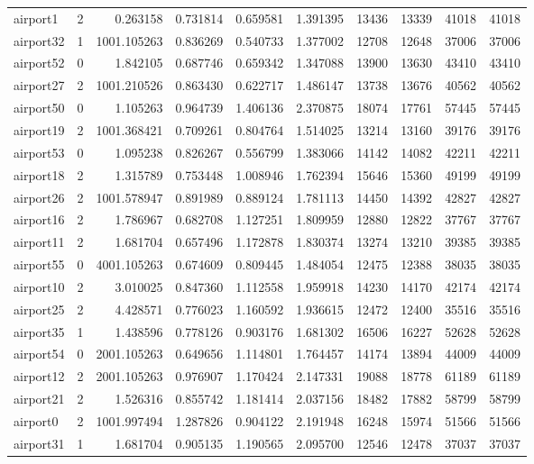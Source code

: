 \begin{longtable}{|l|r|r|r|r|r|r|r|r|r|}
airport1 & 2 & 0.263158 & 0.731814 & 0.659581 & 1.391395 & 13436 & 13339 & 41018 & 41018 \\
airport32 & 1 & 1001.105263 & 0.836269 & 0.540733 & 1.377002 & 12708 & 12648 & 37006 & 37006 \\
airport52 & 0 & 1.842105 & 0.687746 & 0.659342 & 1.347088 & 13900 & 13630 & 43410 & 43410 \\
airport27 & 2 & 1001.210526 & 0.863430 & 0.622717 & 1.486147 & 13738 & 13676 & 40562 & 40562 \\
airport50 & 0 & 1.105263 & 0.964739 & 1.406136 & 2.370875 & 18074 & 17761 & 57445 & 57445 \\
airport19 & 2 & 1001.368421 & 0.709261 & 0.804764 & 1.514025 & 13214 & 13160 & 39176 & 39176 \\
airport53 & 0 & 1.095238 & 0.826267 & 0.556799 & 1.383066 & 14142 & 14082 & 42211 & 42211 \\
airport18 & 2 & 1.315789 & 0.753448 & 1.008946 & 1.762394 & 15646 & 15360 & 49199 & 49199 \\
airport26 & 2 & 1001.578947 & 0.891989 & 0.889124 & 1.781113 & 14450 & 14392 & 42827 & 42827 \\
airport16 & 2 & 1.786967 & 0.682708 & 1.127251 & 1.809959 & 12880 & 12822 & 37767 & 37767 \\
airport11 & 2 & 1.681704 & 0.657496 & 1.172878 & 1.830374 & 13274 & 13210 & 39385 & 39385 \\
airport55 & 0 & 4001.105263 & 0.674609 & 0.809445 & 1.484054 & 12475 & 12388 & 38035 & 38035 \\
airport10 & 2 & 3.010025 & 0.847360 & 1.112558 & 1.959918 & 14230 & 14170 & 42174 & 42174 \\
airport25 & 2 & 4.428571 & 0.776023 & 1.160592 & 1.936615 & 12472 & 12400 & 35516 & 35516 \\
airport35 & 1 & 1.438596 & 0.778126 & 0.903176 & 1.681302 & 16506 & 16227 & 52628 & 52628 \\
airport54 & 0 & 2001.105263 & 0.649656 & 1.114801 & 1.764457 & 14174 & 13894 & 44009 & 44009 \\
airport12 & 2 & 2001.105263 & 0.976907 & 1.170424 & 2.147331 & 19088 & 18778 & 61189 & 61189 \\
airport21 & 2 & 1.526316 & 0.855742 & 1.181414 & 2.037156 & 18482 & 17882 & 58799 & 58799 \\
airport0 & 2 & 1001.997494 & 1.287826 & 0.904122 & 2.191948 & 16248 & 15974 & 51566 & 51566 \\
airport31 & 1 & 1.681704 & 0.905135 & 1.190565 & 2.095700 & 12546 & 12478 & 37037 & 37037 \\

\end{longtable}
